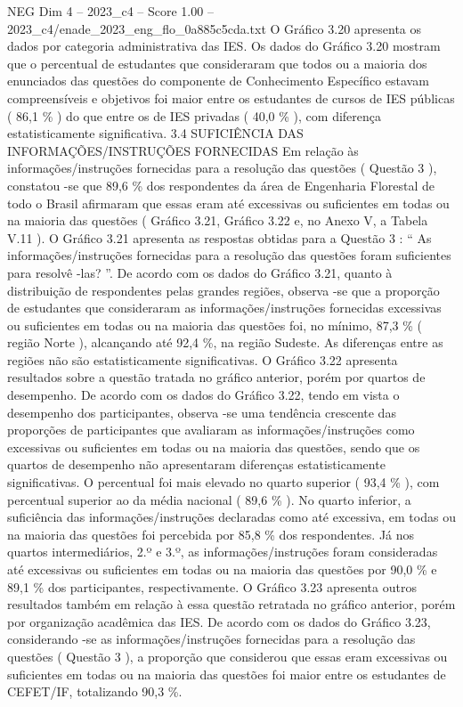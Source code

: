 \begin{textsample}{NEG Dim 4 – 2023\_c4 – Score 1.00 – 2023\_c4/enade\_2023\_eng\_flo\_0a885c5cda.txt}
O Gráfico 3.20 apresenta os dados por categoria administrativa das IES.
Os dados do Gráfico 3.20 mostram que o percentual de estudantes que consideraram que todos ou a maioria dos enunciados das questões do componente de Conhecimento Específico estavam compreensíveis e objetivos foi maior entre os estudantes de cursos de IES públicas ( 86,1 \% ) do que entre os de IES privadas ( 40,0 \% ), com diferença estatisticamente significativa. 3.4 SUFICIÊNCIA DAS INFORMAÇÕES/INSTRUÇÕES FORNECIDAS Em relação às informações/instruções fornecidas para a resolução das questões ( Questão 3 ), constatou -se que 89,6 \% dos respondentes da área de Engenharia Florestal de todo o Brasil afirmaram que essas eram até excessivas ou suficientes em todas ou na maioria das questões ( Gráfico 3.21, Gráfico 3.22 e, no Anexo V, a Tabela V.11 ).
O Gráfico 3.21 apresenta as respostas obtidas para a Questão 3 : “ As informações/instruções fornecidas para a resolução das questões foram suficientes para resolvê -las? ”.
De acordo com os dados do Gráfico 3.21, quanto à distribuição de respondentes pelas grandes regiões, observa -se que a proporção de estudantes que consideraram as informações/instruções fornecidas excessivas ou suficientes em todas ou na maioria das questões foi, no mínimo, 87,3 \% ( região Norte ), alcançando até 92,4 \%, na região Sudeste.
As diferenças entre as regiões não são estatisticamente significativas.
O Gráfico 3.22 apresenta resultados sobre a questão tratada no gráfico anterior, porém por quartos de desempenho.
De acordo com os dados do Gráfico 3.22, tendo em vista o desempenho dos participantes, observa -se uma tendência crescente das proporções de participantes que avaliaram as informações/instruções como excessivas ou suficientes em todas ou na maioria das questões, sendo que os quartos de desempenho não apresentaram diferenças estatisticamente significativas.
O percentual foi mais elevado no quarto superior ( 93,4 \% ), com percentual superior ao da média nacional ( 89,6 \% ).
No quarto inferior, a suficiência das informações/instruções declaradas como até excessiva, em todas ou na maioria das questões foi percebida por 85,8 \% dos respondentes.
Já nos quartos intermediários, 2.º e 3.º, as informações/instruções foram consideradas até excessivas ou suficientes em todas ou na maioria das questões por 90,0 \% e 89,1 \% dos participantes, respectivamente.
O Gráfico 3.23 apresenta outros resultados também em relação à essa questão retratada no gráfico anterior, porém por organização acadêmica das IES.
De acordo com os dados do Gráfico 3.23, considerando -se as informações/instruções fornecidas para a resolução das questões ( Questão 3 ), a proporção que considerou que essas eram excessivas ou suficientes em todas ou na maioria das questões foi maior entre os estudantes de CEFET/IF, totalizando 90,3 \%.

\end{textsample}

